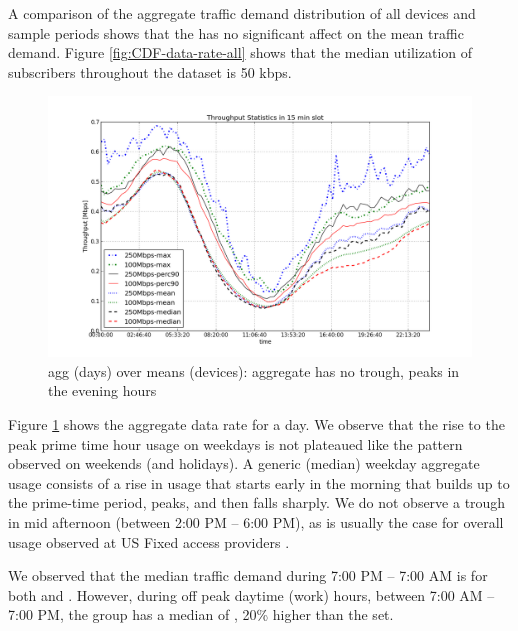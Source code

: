 A comparison of the aggregate traffic demand distribution of all devices and sample periods shows
that the \treatment{} has no significant affect on the mean traffic demand. Figure \ref{fig:CDF-data-rate-all}
shows that the median utilization of subscribers throughout the dataset is 50 kbps. 

\begin{figure}[ht]
\begin{minipage}{\linewidth}
  \centering
  \includegraphics[width=\linewidth]{figures/describe-total-throughput-per-day[replace].png}
  \caption{agg (days) over means (devices): aggregate has no trough, peaks in the evening hours}
  \label{fig:TS-data-rate-daily}
\end{minipage}
\end{figure}



Figure \ref{fig:TS-data-rate-daily} shows the aggregate data rate for a day. We observe that the rise to the peak prime time hour usage on weekdays is not plateaued like the pattern observed on weekends (and holidays).
A generic (median) weekday aggregate usage consists of a rise in usage that starts
early in the morning that builds up to the prime-time period, peaks, and then falls sharply.
We do not observe a trough in mid afternoon (between 2:00 PM -- 6:00 PM), as is usually
the case for overall usage observed at US Fixed access providers \cite{sandvine20141h}.

We observed that the median traffic demand during 7:00 PM -- 7:00 AM is  for
both \treatment{} and \control{}. However, during off peak daytime (work) hours, between
7:00 AM -- 7:00 PM, the \treatment{} group has a median of , 20\% higher than
the \control{} set.


